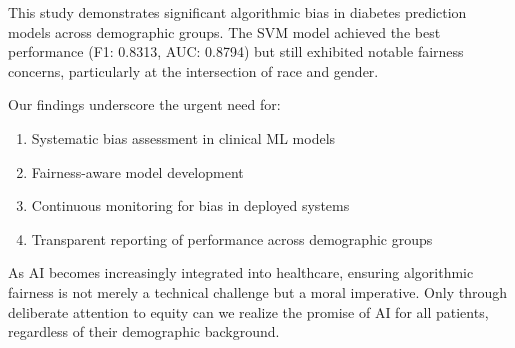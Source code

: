 \documentclass[12pt,a4paper]{article}
\begin{document}
This study demonstrates significant algorithmic bias in diabetes prediction 
models across demographic groups. The SVM model achieved the best performance 
(F1: 0.8313, AUC: 0.8794) but still exhibited notable fairness concerns, 
particularly at the intersection of race and gender.

Our findings underscore the urgent need for:
\begin{enumerate}
    \item Systematic bias assessment in clinical ML models
    \item Fairness-aware model development
    \item Continuous monitoring for bias in deployed systems
    \item Transparent reporting of performance across demographic groups
\end{enumerate}

As AI becomes increasingly integrated into healthcare, ensuring algorithmic 
fairness is not merely a technical challenge but a moral imperative. Only 
through deliberate attention to equity can we realize the promise of AI 
for all patients, regardless of their demographic background.
\end{document}
